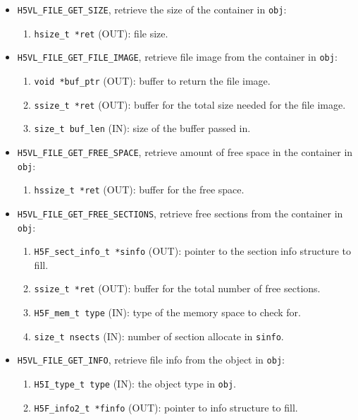 \begin{itemize}

\item {\tt H5VL\_FILE\_GET\_SIZE}, retrieve the size of the container
  in {\tt obj}:
  \begin{enumerate}
  \item {\tt hsize\_t *ret} (OUT): file size.
  \end{enumerate}

\item {\tt H5VL\_FILE\_GET\_FILE\_IMAGE}, retrieve file image from the
  container in {\tt obj}:
  \begin{enumerate}
  \item {\tt void *buf\_ptr} (OUT): buffer to return the file image.
  \item {\tt ssize\_t *ret} (OUT): buffer for the total size needed for
    the file image.
  \item {\tt size\_t buf\_len} (IN): size of the buffer passed in.
  \end{enumerate}

\item {\tt H5VL\_FILE\_GET\_FREE\_SPACE}, retrieve amount of free
  space in the container in {\tt obj}:
  \begin{enumerate}
  \item {\tt hssize\_t *ret} (OUT): buffer for the free space.
  \end{enumerate}

\item {\tt H5VL\_FILE\_GET\_FREE\_SECTIONS}, retrieve free sections from the
  container in {\tt obj}:
  \begin{enumerate}
  \item {\tt H5F\_sect\_info\_t *sinfo} (OUT): pointer to the section
    info structure to fill.
  \item {\tt ssize\_t *ret} (OUT): buffer for the total number of free
    sections.
  \item {\tt H5F\_mem\_t type} (IN): type of the memory space to check
    for.
  \item {\tt size\_t nsects} (IN): number of section allocate in {\tt sinfo}.
  \end{enumerate}

\item {\tt H5VL\_FILE\_GET\_INFO}, retrieve file info from the
  object in {\tt obj}:
  \begin{enumerate}
  \item {\tt H5I\_type\_t type} (IN): the object type in {\tt obj}.
  \item {\tt H5F\_info2\_t *finfo} (OUT): pointer to info structure to fill.
  \end{enumerate}


\end{itemize}
